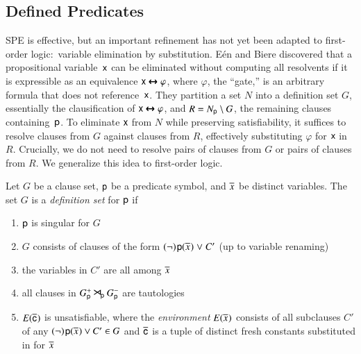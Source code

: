 \subsection{Defined Predicates}

SPE is effective, but an important refinement has not yet been adapted to
first-order logic:\ variable elimination by substitution. E{\'{e}}n and Biere
\cite{eb-2005-satpreprocess} discovered that a propositional variable~$\mathsf{x}$ can be
eliminated without computing all resolvents if it is expressible as an
equivalence $\mathsf{x} \pmb{\leftrightarrow} \varphi$, where $\varphi$, the ``gate,''
is an arbitrary formula that does not reference~$\mathsf{x}$.
They partition a set $N$
into a definition set $G$, essentially the
clausification of $\mathsf{x} \pmb{\leftrightarrow} \varphi$, and
$R = N_{\mathsf{p}} \setminus G$, the remaining
clauses containing~$\mathsf{p}$. To eliminate $\mathsf{x}$ from $N$ while
preserving satisfiability, it suffices to resolve clauses from $G$ against
clauses from $R$, effectively substituting $\varphi$ for $\mathsf{x}$ in $R$.
Crucially, we do not need to resolve pairs of clauses from $G$
or pairs of clauses from $R$.
We generalize this idea to first-order logic.

\begin{defi}
   \label{def:definition}
   Let $G$ be a clause set, $\mathsf{p}$ be a predicate symbol, and
   $\overline{x}_{}$ be distinct variables.
%
   The set $G$ is a \emph{definition set} for $\mathsf{p}$ if
   \begin{enumerate}
      \item $\mathsf{p}$ is singular for $G$
      \item $G$ consists of clauses of the form $(\neg)\kern.2ex{\mathsf{p}(\overline{x}_{})} \mathrel{\lor} C'$ (up to variable renaming)
      \item the variables in $C'$ are all among $\overline{x}_{}$
      \item all clauses in $G^+_{\mathsf{p}}
      \mathbin{\smash{\hbox{\Large$\kern-.1ex\rtimes$}}}_{\!\mathsf{p}} G^-_{\mathsf{p}}$ are tautologies
      \item $E(\overline{\mathsf{c}}_{})$ is unsatisfiable, where
      the \emph{environment} $E(\overline{x}_{})$ consists of all subclauses $C'$ of any
      $(\neg)\kern.2ex{\mathsf{p}(\overline{x}_{})} \mathbin{\mathrel{\lor}} C' \in G$ and
      $\overline{\mathsf{c}}_{}$ is a tuple of distinct fresh constants substituted
      in for $\overline{x}_{}$
   \end{enumerate}
\end{defi}


